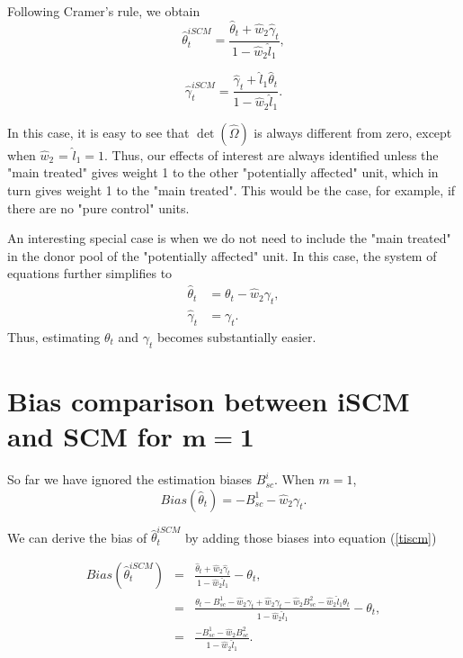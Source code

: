 Following Cramer's rule, we obtain
\begin{equation}
\widehat{\theta}^{iSCM}_{t}= \frac {\widehat{\theta}_{t}+\widehat{w}_{2}\widehat{\gamma}_{t}}{1-\widehat{w}_{2}\widehat{l}_{1}},\label{tiscm}
\end{equation}

\begin{equation*}
\widehat{\gamma}^{iSCM}_{t}= \frac {\widehat{\gamma}_{t}+\widehat{l}_{1}\widehat{\theta}_{t}}{1-\widehat{w}_{2}\widehat{l}_{1}}.
\end{equation*}

In this case, it is easy to see that $\det(\widehat{\Omega})$ is always different from zero, except when $\widehat{w}_{2}$ = $\widehat{l}_{1}= 1$. Thus, our effects of interest are always identified unless the "main treated" gives weight 1 to the other "potentially affected" unit, which in turn gives weight 1 to the "main treated". This would be the case, for example, if there are no "pure control" units.

An interesting special case is when we do not need to include the "main treated" in the donor pool of the "potentially affected" unit.
In this case, the system of equations further simplifies to
\begin{align}
\label{simp}
\widehat{\theta}_{t}&=\theta_{t} - \widehat{w}_{2}{\gamma_{t}},\\
\widehat{\gamma}_{t}&= \gamma_{t}.
\end{align}
Thus, estimating  $\theta_t$ and $\gamma_t$ becomes substantially easier.

\section{Bias comparison between iSCM and SCM for $\bm{m=1}$}\label{biasm=1}
So far we have ignored the estimation biases $B_{sc}^i$. 
When $m=1$, $$Bias\left(\widehat{\theta}_{t}\right)=-B_{sc}^1-\widehat{w}_{2}\gamma_t.$$

We can derive the bias of $\widehat{\theta}^{iSCM}_{t}$ by adding those biases into equation (\ref{tiscm}) 

\begin{eqnarray*}
Bias\left(\widehat{\theta}^{iSCM}_{t}\right)&=& \frac {\widehat{\theta}_{t}+\widehat{w}_{2}\widehat{\gamma}_{t}}{1-\widehat{w}_{2}\widehat{l}_{1}}-\theta_t,\\
&=&\frac {\theta_t-B_{sc}^1-\widehat{w}_{2}\gamma_t+\widehat{w}_{2}\gamma_t-\widehat{w}_{2}B_{sc}^2-\widehat{w}_{2}\widehat{l}_{1}\theta_t}{1-\widehat{w}_{2}\widehat{l}_{1}}-\theta_t,\\
&=&\frac {-B_{sc}^1-\widehat{w}_{2}B_{sc}^2}{1-\widehat{w}_{2}\widehat{l}_{1}}.
\end{eqnarray*}

